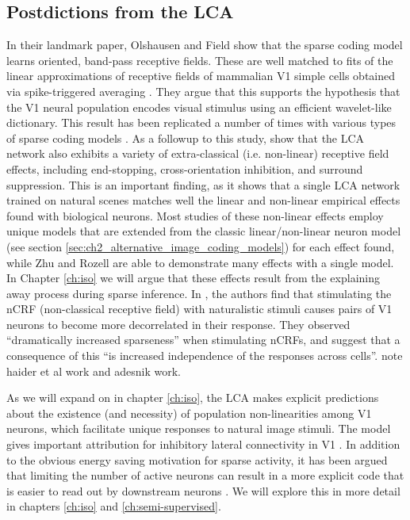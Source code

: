 \subsection{Postdictions from the LCA}
In their landmark paper, Olshausen and Field \citeyearpar{olshausen1996emergence} show that the sparse coding model learns oriented, band-pass receptive fields. These are well matched to fits of the linear approximations of receptive fields of mammalian V1 simple cells obtained via spike-triggered averaging \parencite{vanHateren1998independent}. They argue that this supports the hypothesis that the V1 neural population encodes visual stimulus using an efficient wavelet-like dictionary. This result has been replicated a number of times with various types of sparse coding models \citeyearpar{zylberberg2011sparse, zylberberg2013sparse, rehn2007network}. As a followup to this study, \parencite{zhu2013visual} show that the LCA network also exhibits a variety of extra-classical (i.e. non-linear) receptive field effects, including end-stopping, cross-orientation inhibition, and surround suppression. This is an important finding, as it shows that a single LCA network trained on natural scenes matches well the linear and non-linear empirical effects found with biological neurons. Most studies of these non-linear effects employ unique models that are extended from the classic linear/non-linear neuron model (see section \ref{sec:ch2_alternative_image_coding_models}) for each effect found, while Zhu and Rozell are able to demonstrate many effects with a single model. In Chapter \ref{ch:iso} we will argue that these effects result from the explaining away process during sparse inference. In \parencite{vinje2000sparse}, the authors find that stimulating the nCRF (non-classical receptive field) with naturalistic stimuli causes pairs of V1 neurons to become more decorrelated in their response. They observed ``dramatically increased sparseness'' when stimulating nCRFs, and suggest that a consequence of this ``is increased independence of the responses across cells''. note haider et al work and adesnik work.

As we will expand on in chapter \ref{ch:iso}, the LCA makes explicit predictions about the existence (and necessity) of population non-linearities among V1 neurons, which facilitate unique responses to natural image stimuli. The model gives important attribution for inhibitory lateral connectivity in V1 \citeyearpar{zhu2015modeling}. In addition to the obvious energy saving motivation for sparse activity, it has been argued that limiting the number of active neurons can result in a more explicit code that is easier to read out by downstream neurons \parencite{olshasen2003principles}. We will explore this in more detail in chapters \ref{ch:iso} and \ref{ch:semi-supervised}.

